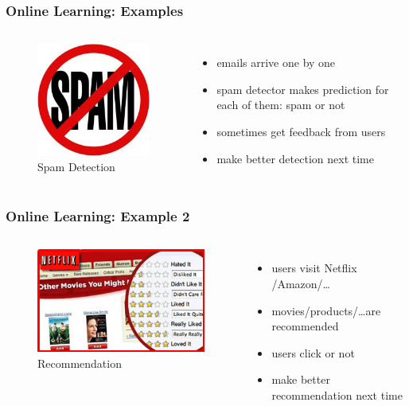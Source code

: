 \documentclass{beamer}
\begin{document}
\begin{frame}
\frametitle{Online Learning: Examples}

\begin{columns}
\begin{figure}
\includegraphics[scale = 0.4]{spam}
\caption{Spam Detection}
\end{figure}
\begin{itemize}
\item emails arrive one by one
\item spam detector makes prediction for each of them: {\color{blue}spam or not}
\item sometimes get {\color{blue}feedback} from users
\item make better detection next time  
\end{itemize}

\end{columns}

\end{frame}

\begin{frame}
\frametitle{Online Learning: Example 2}
\begin{columns}
\begin{figure}
\includegraphics[scale = 0.4]{recommendation}
\caption{Recommendation}
\end{figure}
\begin{itemize}
\item users visit Netflix /Amazon/\ldots
\item movies/products/\ldots are recommended 
\item users {\color{blue}click or not}
\item make better recommendation next time   
\end{itemize}

\end{columns}


\end{frame}
\end{document}
